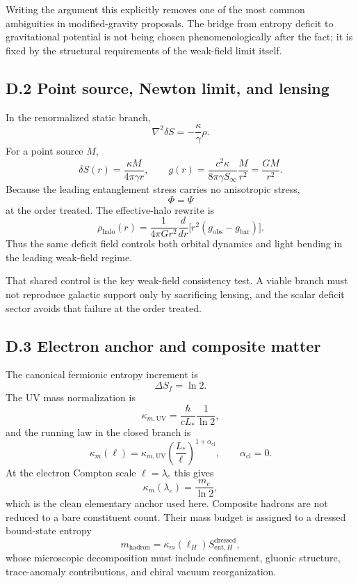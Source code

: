 \documentclass[11pt]{article}
\begin{document}
Writing the argument this explicitly removes one of the most common ambiguities in modified-gravity proposals. The bridge from entropy deficit to gravitational potential is not being chosen phenomenologically after the fact; it is fixed by the structural requirements of the weak-field limit itself.

\subsection*{D.2 Point source, Newton limit, and lensing}

In the renormalized static branch,
\[
\nabla^2\delta S=-\frac{\kappa}{\gamma}\rho.
\]
For a point source $M$,
\[
\delta S(r)=\frac{\kappa M}{4\pi\gamma r},
\qquad
g(r)=\frac{c^2\kappa}{8\pi\gamma S_\infty}\frac{M}{r^2}
=
\frac{GM}{r^2}.
\]
Because the leading entanglement stress carries no anisotropic stress,
\[
\Phi=\Psi
\]
at the order treated. The effective-halo rewrite is
\[
\rho_{\mathrm{halo}}(r)=\frac{1}{4\pi Gr^2}\frac{d}{dr}\Big[r^2(g_{\mathrm{obs}}-g_{\mathrm{bar}})\Big].
\]
Thus the same deficit field controls both orbital dynamics and light bending in the leading weak-field regime.

That shared control is the key weak-field consistency test. A viable branch must not reproduce galactic support only by sacrificing lensing, and the scalar deficit sector avoids that failure at the order treated.

\subsection*{D.3 Electron anchor and composite matter}

The canonical fermionic entropy increment is
\[
\Delta S_f=\ln 2.
\]
The UV mass normalization is
\[
\kappa_{m,\mathrm{UV}}=\frac{\hbar}{cL_*}\frac{1}{\ln 2},
\]
and the running law in the closed branch is
\[
\kappa_m(\ell)=\kappa_{m,\mathrm{UV}}\left(\frac{L_*}{\ell}\right)^{1+\alpha_{\mathrm{cl}}},
\qquad
\alpha_{\mathrm{cl}}=0.
\]
At the electron Compton scale $\ell=\lambda_e$ this gives
\[
\kappa_m(\lambda_e)=\frac{m_e}{\ln 2},
\]
which is the clean elementary anchor used here. Composite hadrons are not reduced to a bare constituent count. Their mass budget is assigned to a dressed bound-state entropy
\[
m_{\mathrm{hadron}}=\kappa_m(\ell_H)S_{\mathrm{ent},H}^{\mathrm{dressed}},
\]
whose microscopic decomposition must include confinement, gluonic structure, trace-anomaly contributions, and chiral vacuum reorganization.
\end{document}
